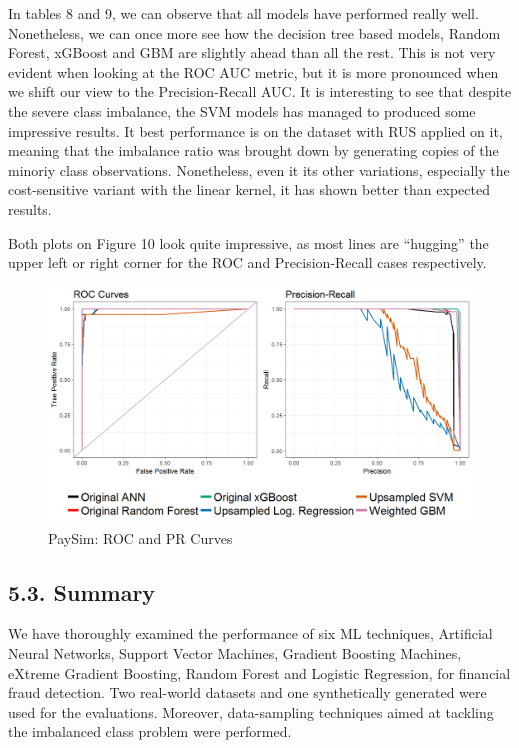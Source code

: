 \documentclass[12pt,]{article}
\begin{document}
In tables 8 and 9, we can observe that all models have performed really
well. Nonetheless, we can once more see how the decision tree based
models, Random Forest, xGBoost and GBM are slightly ahead than all the
rest. This is not very evident when looking at the ROC AUC metric, but
it is more pronounced when we shift our view to the Precision-Recall
AUC. It is interesting to see that despite the severe class imbalance,
the SVM models has managed to produced some impressive results. It best
performance is on the dataset with RUS applied on it, meaning that the
imbalance ratio was brought down by generating copies of the minoriy
class observations. Nonetheless, even it its other variations,
especially the cost-sensitive variant with the linear kernel, it has
shown better than expected results.

Both plots on Figure 10 look quite impressive, as most lines are
``hugging'' the upper left or right corner for the ROC and
Precision-Recall cases respectively.

\begin{figure}
\centering
\includegraphics[width=1\textwidth,height=\textheight]{figures/paySim/paySim_pr_roc.png}
\caption{PaySim: ROC and PR Curves}
\end{figure}

\hypertarget{summary}{%
\subsection{5.3. Summary}\label{summary}}

We have thoroughly examined the performance of six ML techniques,
Artificial Neural Networks, Support Vector Machines, Gradient Boosting
Machines, eXtreme Gradient Boosting, Random Forest and Logistic
Regression, for financial fraud detection. Two real-world datasets and
one synthetically generated were used for the evaluations. Moreover,
data-sampling techniques aimed at tackling the imbalanced class problem
were performed.
\end{document}
